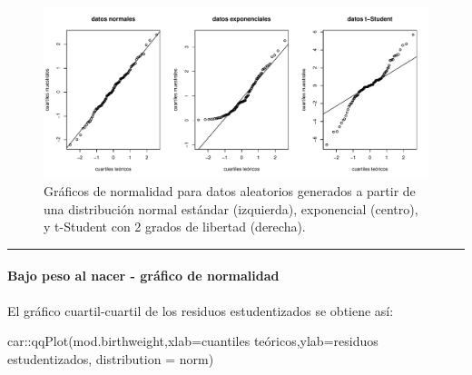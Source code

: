 \documentclass[
]{article}
\newenvironment{Shaded}{\begin{snugshade}}{\end{snugshade}}
\newcommand{\AttributeTok}[1]{\textcolor[rgb]{0.77,0.63,0.00}{#1}}
\newcommand{\FunctionTok}[1]{\textcolor[rgb]{0.00,0.00,0.00}{#1}}
\newcommand{\NormalTok}[1]{#1}
\newcommand{\SpecialCharTok}[1]{\textcolor[rgb]{0.00,0.00,0.00}{#1}}
\newcommand{\StringTok}[1]{\textcolor[rgb]{0.31,0.60,0.02}{#1}}
\begin{document}
\begin{figure}

{\centering \includegraphics{MLGI_files/figure-latex/qqplots-1} 

}

\caption{Gráficos de normalidad para datos aleatorios generados a partir de una distribución normal estándar (izquierda), exponencial (centro), y t-Student con 2 grados de libertad (derecha).}\label{fig:qqplots}
\end{figure}

\rule{\textwidth}{0.4pt}

\hypertarget{bajo-peso-al-nacer---gruxe1fico-de-normalidad}{%
\paragraph*{Bajo peso al nacer - gráfico de normalidad}\label{bajo-peso-al-nacer---gruxe1fico-de-normalidad}}

El gráfico cuartil-cuartil de los residuos estudentizados se obtiene así:

\begin{Shaded}
\begin{Highlighting}[]
\NormalTok{car}\SpecialCharTok{::}\FunctionTok{qqPlot}\NormalTok{(mod.birthweight,}\AttributeTok{xlab=}\StringTok{\textquotesingle{}cuantiles teóricos\textquotesingle{}}\NormalTok{,}\AttributeTok{ylab=}\StringTok{\textquotesingle{}residuos estudentizados\textquotesingle{}}\NormalTok{,}
       \AttributeTok{distribution =} \StringTok{\textquotesingle{}norm\textquotesingle{}}\NormalTok{)}
\end{Highlighting}
\end{Shaded}
\end{document}
